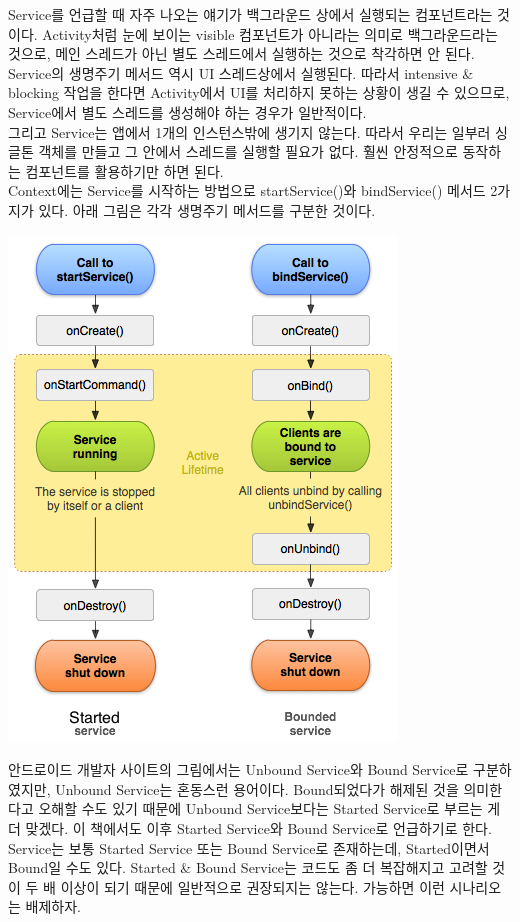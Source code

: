 Service를 언급할 때 자주 나오는 얘기가 백그라운드 상에서 실행되는 컴포넌트라는 것이다. Activity처럼 눈에 보이는 visible 컴포넌트가 아니라는 의미로 백그라운드라는 것으로, 메인 스레드가 아닌 별도 스레드에서 실행하는 것으로 착각하면 안 된다.
Service의 생명주기 메서드 역시 UI 스레드상에서 실행된다. 
따라서 intensive \& blocking 작업을 한다면 Activity에서 UI를 처리하지 못하는 상황이 생길 수 있으므로, Service에서 별도 스레드를 생성해야 하는 경우가 일반적이다.\\

그리고 Service는 앱에서 1개의 인스턴스밖에 생기지 않는다. 따라서 우리는 일부러 싱글톤 객체를 만들고 그 안에서 스레드를 실행할 필요가 없다. 훨씬 안정적으로 동작하는 컴포넌트를 활용하기만 하면 된다.\\

Context에는 Service를 시작하는 방법으로 startService()와 bindService() 메서드 2가지가 있다. 아래 그림은 각각 생명주기 메서드를 구분한 것이다. 

\includegraphics[scale=0.7]{service-lifecycle}

안드로이드 개발자 사이트의 그림에서는 Unbound Service와 Bound Service로 구분하였지만, Unbound Service는 혼동스런 용어이다. Bound되었다가 해제된 것을 의미한다고 오해할 수도 있기 때문에 Unbound Service보다는 Started Service로 부르는 게 더 맞겠다. 이 책에서도 이후 Started Service와 Bound Service로 언급하기로 한다.\\

Service는 보통 Started Service 또는 Bound Service로 존재하는데, Started이면서 Bound일 수도 있다.  Started \& Bound Service는 코드도 좀 더 복잡해지고 고려할 것이 두 배 이상이 되기 때문에 일반적으로 권장되지는 않는다. 가능하면 이런 시나리오는 배제하자.


